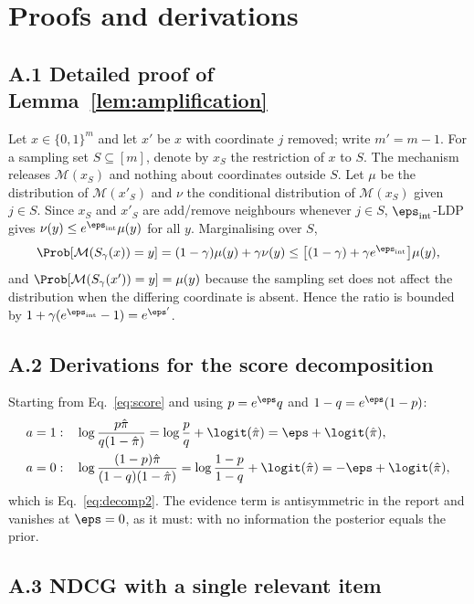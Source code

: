 \appendix

\section{Proofs and derivations}\label{app:proofs}

\subsection*{A.1 Detailed proof of Lemma~\ref{lem:amplification}}

Let $x\in\{0,1\}^{m}$ and let $x'$ be $x$ with coordinate $j$ removed; write $m'=m-1$. For a sampling set $S\subseteq[m]$, denote by $x_S$ the restriction of $x$ to $S$. The mechanism releases $\mathcal{M}(x_S)$ and nothing about coordinates outside $S$. Let $\mu$ be the distribution of $\mathcal{M}(x'_{S})$ and $\nu$ the conditional distribution of $\mathcal{M}(x_S)$ given $j\in S$. Since $x_S$ and $x'_S$ are add/remove neighbours whenever $j\in S$, $\eps_{\text{int}}$-LDP gives $\nu(y)\le e^{\eps_{\text{int}}}\mu(y)$ for all $y$. Marginalising over $S$,
\begin{equation}
\Prob[\mathcal{M}(S_\gamma(x))=y]=(1-\gamma)\mu(y)+\gamma\nu(y)
\le\big[(1-\gamma)+\gamma e^{\eps_{\text{int}}}\big]\mu(y),
\end{equation}
and $\Prob[\mathcal{M}(S_\gamma(x'))=y]=\mu(y)$ because the sampling set does not affect the distribution when the differing coordinate is absent. Hence the ratio is bounded by $1+\gamma(e^{\eps_{\text{int}}}-1)=e^{\eps'}$.

\subsection*{A.2 Derivations for the score decomposition}

Starting from Eq.~\eqref{eq:score} and using $p=e^{\eps}q$ and $1-q=e^{\eps}(1-p)$:
\begin{align}
a=1:&\quad \log\frac{p\hat\pi}{q(1-\hat\pi)}=\log\frac{p}{q}+\logit(\hat\pi)=\eps+\logit(\hat\pi),\\
a=0:&\quad \log\frac{(1-p)\hat\pi}{(1-q)(1-\hat\pi)}=\log\frac{1-p}{1-q}+\logit(\hat\pi)=-\eps+\logit(\hat\pi),
\end{align}
which is Eq.~\eqref{eq:decomp2}. The evidence term is antisymmetric in the report and vanishes at $\eps=0$, as it must: with no information the posterior equals the prior.

\subsection*{A.3 NDCG with a single relevant item}


